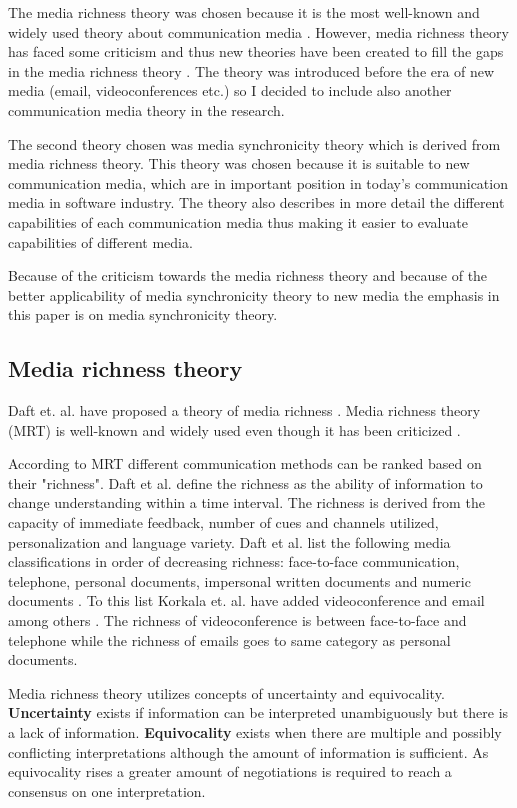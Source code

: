 \documentclass[conference]{IEEEtran}
\begin{document}
The media richness theory was chosen because it is the most well-known and widely used theory about communication media \cite{1986daft}\cite{2006korkala}. However, media richness theory has faced some criticism and thus new theories have been created to fill the gaps in the media richness theory \cite{1999dennis}. The theory was introduced before the era of new media (email, videoconferences etc.) so I decided to include also another communication media theory in the research.

The second theory chosen was media synchronicity theory which is derived from media richness theory. This theory was chosen because it is suitable to new communication media, which are in important position in today's communication media in software industry. The theory also describes in more detail the different capabilities of each communication media thus making it easier to evaluate capabilities of different media.

Because of the criticism towards the media richness theory and because of the better applicability of media synchronicity theory to new media the emphasis in this paper is on media synchronicity theory.

\subsection{Media richness theory}

Daft et. al. have proposed a theory of media richness \cite{1986daft}. Media richness theory (MRT) is well-known and widely used even though it has been criticized \cite{2006korkala} \cite{1999dennis}. 

According to MRT different communication methods can be ranked based on their "richness". Daft et al. define the richness as the ability of information to change understanding within a time interval. The richness is derived from the capacity of immediate feedback, number of cues and channels utilized, personalization and language variety. Daft et al. list the following media classifications in order of decreasing richness: face-to-face communication, telephone, personal documents, impersonal written documents and numeric documents \cite{1986daft}. To this list Korkala et. al. have added videoconference and email among others \cite{2006korkala}. The richness of videoconference is between face-to-face and telephone while the richness of emails goes to same category as personal documents.

Media richness theory utilizes concepts of uncertainty and equivocality. \textbf{Uncertainty} exists if information can be interpreted unambiguously but there is a lack of information. \textbf{Equivocality} exists when there are multiple and possibly conflicting interpretations although the amount of information is sufficient. As equivocality rises a greater amount of negotiations is required to reach a consensus on one interpretation. \cite{1999dennis}
\end{document}
